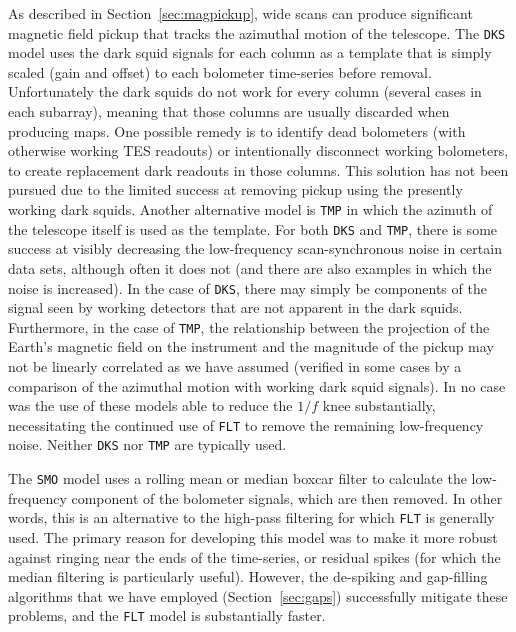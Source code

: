 \documentclass[useAMS,usenatbib,nofootinbib]{mn2e}
\newcommand{\model}[1]{\texttt{#1}}
\begin{document}
As described in Section~\ref{sec:magpickup}, wide scans can produce
significant magnetic field pickup that tracks the azimuthal motion of
the telescope. The \model{DKS} model uses the dark squid signals for
each column as a template that is simply scaled (gain and offset) to
each bolometer time-series before removal. Unfortunately the dark
squids do not work for every column (several cases in each subarray),
meaning that those columns are usually discarded when producing
maps. One possible remedy is to identify dead bolometers (with
otherwise working TES readouts) or intentionally disconnect working
bolometers, to create replacement dark readouts in those columns. This
solution has not been pursued due to the limited success at removing
pickup using the presently working dark squids. Another alternative
model is \model{TMP} in which the azimuth of the telescope itself is
used as the template. For both \model{DKS} and \model{TMP}, there is
some success at visibly decreasing the low-frequency scan-synchronous
noise in certain data sets, although often it does not (and there are
also examples in which the noise is increased). In the case of
\model{DKS}, there may simply be components of the signal seen by
working detectors that are not apparent in the dark
squids. Furthermore, in the case of \model{TMP}, the relationship
between the projection of the Earth's magnetic field on the instrument
and the magnitude of the pickup may not be linearly correlated as we
have assumed (verified in some cases by a comparison of the azimuthal
motion with working dark squid signals). In no case was the use of
these models able to reduce the $1/f$ knee substantially,
necessitating the continued use of \model{FLT} to remove the remaining
low-frequency noise. Neither \model{DKS} nor \model{TMP} are typically
used.


The \model{SMO} model uses a rolling mean or median boxcar filter to
calculate the low-frequency component of the bolometer signals, which
are then removed. In other words, this is an alternative to the
high-pass filtering for which \model{FLT} is generally used. The
primary reason for developing this model was to make it more robust
against ringing near the ends of the time-series, or residual spikes
(for which the median filtering is particularly useful). However, the
de-spiking and gap-filling algorithms that we have employed
(Section~\ref{sec:gaps}) successfully mitigate these problems, and the
\model{FLT} model is substantially faster.
\end{document}
